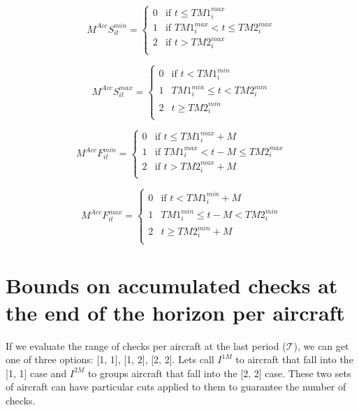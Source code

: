 \documentclass[a4paper,onecolumn,fleqn]{article}
\begin{document}
  \begin{multicols}{2}
  \[
   M^{Acc}S^{min}_{it} = 
    \begin{cases} 
     0 & \text{if } t \le TM1^{max}_i\\
     1 & \text{if } TM1^{max}_i < t \le TM2^{max}_i \\
     2 & \text{if } t > TM2^{max}_i \\
    \end{cases}
  \]

  \[
   M^{Acc}S^{max}_{it} = 
    \begin{cases} 
     0 & \text{if } t < TM1^{min}_i \\
     1 & TM1^{min}_i \le t < TM2^{min}_i \\
     2 & t \ge TM2^{min}_i \\
    \end{cases}
  \]

  \columnbreak

  \[
   M^{Acc}F^{min}_{it} = 
    \begin{cases} 
     0 & \text{if } t \le TM1^{max}_i + M\\
     1 & \text{if } TM1^{max}_i < t - M \le TM2^{max}_i \\
     2 & \text{if } t > TM2^{max}_i + M \\
    \end{cases}
  \]

  \[
   M^{Acc}F^{max}_{it} = 
    \begin{cases} 
     0 & \text{if } t < TM1^{min}_i + M\\
     1 & TM1^{min}_i \le t - M < TM2^{min}_i\\
     2 & t \ge TM2^{min}_i + M\\
    \end{cases}
  \]

  \end{multicols}

\section{Bounds on accumulated checks at the end of the horizon per aircraft}

  If we evaluate the range of checks per aircraft at the last period ($\mathcal{T}$), we can get one of three options: [1, 1], [1, 2], [2, 2]. Lets call $I^{1M}$ to aircraft that fall into the [1, 1] case and $I^{2M}$ to groups aircraft that fall into the [2, 2] case. These two sets of aircraft can have particular cuts applied to them to guarantee the number of checks.
\end{document}
